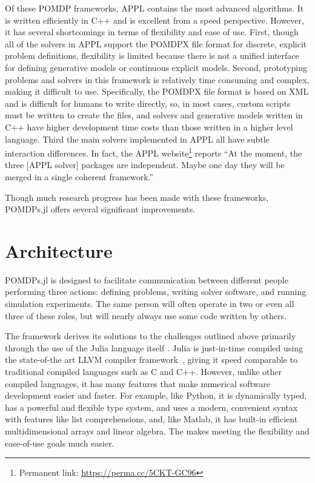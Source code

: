 Of these POMDP frameworks, APPL contains the most advanced algorithms.
It is written efficiently in C++ and is excellent from a speed perspective.
However, it has several shortcomings in terms of flexibility and ease of use.
First, though all of the solvers in APPL support the POMDPX file format for discrete, explicit problem definitions, flexibility is limited because there is not a unified interface for defining generative models or continuous explicit models.
Second, prototyping problems and solvers in this framework is relatively time consuming and complex, making it difficult to use.
Specifically, the POMDPX file format is based on XML and is difficult for humans to write directly, so, in most cases, custom scripts must be written to create the files, and solvers and generative models written in C++ have higher development time costs than those written in a higher level language.
Third the main solvers implemented in APPL all have subtle interaction differences.
In fact, the APPL website\footnote{Permanent link: \url{https://perma.cc/5CKT-GC96}} reports ``At the moment, the three [APPL solver] packages are independent. Maybe one day they will be merged in a single coherent framework.''

Though much research progress has been made with these frameworks, POMDPs.jl offers several significant improvements.

\section{Architecture}

POMDPs.jl is designed to facilitate communication between different people performing three actions: defining problems, writing solver software, and running simulation experiments.
The same person will often operate in two or even all three of these roles, but will nearly always use some code written by others.

The framework derives its solutions to the challenges outlined above primarily through the use of the Julia language itself \cite{bezanson2017julia}.
Julia is just-in-time compiled using the state-of-the art LLVM compiler framework~\cite{lattner2004llvm}, giving it speed comparable to traditional compiled languages such as C and C++.
However, unlike other compiled languages, it has many features that make numerical software development easier and faster.
For example, like Python, it is dynamically typed, has a powerful and flexible type system, and uses a modern, convenient syntax with features like list comprehensions, and, like Matlab, it has built-in efficient multidimensional arrays and linear algebra.
The makes meeting the flexibility and ease-of-use goals much easier.


